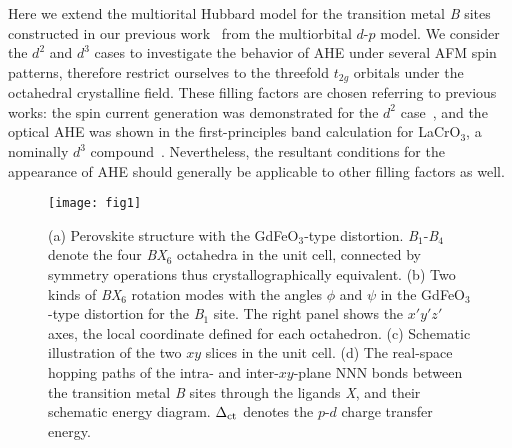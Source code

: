 \documentclass[aps,twocolumn,prb,preprintnumbers,amsmath,amssymb]{revtex4-2}
\begin{document}
Here we extend the multiorital Hubbard model for the transition metal {\it B} sites~\cite{maekawa,mizokawa,mochizuki,mochizuki2}
 constructed in our previous work~\cite{naka3} from the multiorbital $d$-$p$ model. 
We consider the $d^2$ and $d^3$ cases 
 to investigate the behavior of AHE under several AFM spin patterns, 
 therefore restrict ourselves to the threefold $t_{2g}$ orbitals under the octahedral crystalline field. 
These filling factors are chosen referring to previous works: 
 the spin current generation was demonstrated for the $d^2$ case~\cite{naka3}, 
 and the optical AHE was shown in the first-principles band calculation for LaCrO$_3$, a nominally $d^3$ compound~\cite{solovyev}. 
Nevertheless, the resultant conditions for the appearance of AHE should generally be applicable to other filling factors as well. 
%
\begin{figure}[t]
\begin{center}
\texttt{[image: fig1]}
\end{center}
\caption{
(a) Perovskite structure with the GdFeO$_3$-type distortion. 
{\it B}$_1$-{\it B}$_4$ denote the four {\it BX}$_6$ octahedra in the unit cell, connected by symmetry operations thus crystallographically equivalent. 
(b) Two kinds of {\it BX}$_6$ rotation modes with the angles $\phi$ and $\psi$ in the GdFeO$_3$-type distortion for the {\it B}$_1$ site. 
The right panel shows the $x'y'z'$ axes, the local coordinate defined for each octahedron.
(c) Schematic illustration of the two $xy$ slices in the unit cell.
(d) The real-space hopping paths of the intra- and inter-$xy$-plane NNN bonds between the transition metal {\it B} sites through the ligands {\it X}, 
and their schematic energy diagram.
$\Delta_{\rm ct}$ denotes the $p$-$d$ charge transfer energy.
}
\label{fig1}
\end{figure}
\end{document}
